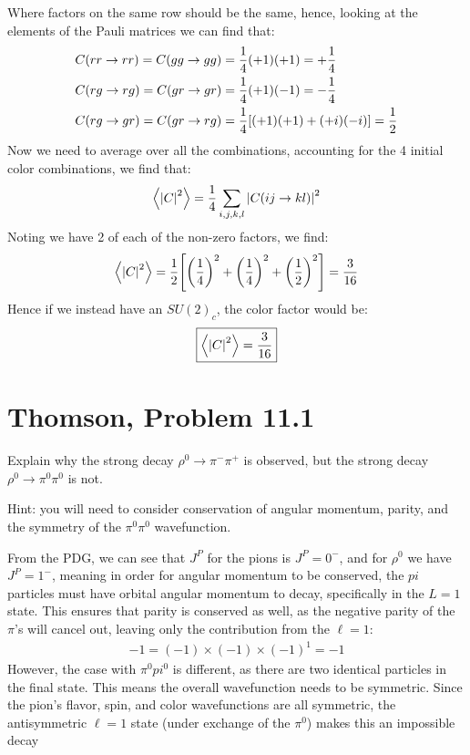 \documentclass[12pt]{article}
\begin{document}
Where factors on the same row should be the same, hence, looking at the elements of the Pauli matrices we can find that:
\begin{align*}
  C(rr\to rr)=C(gg\to gg)&=\frac14(+1)(+1)=+\frac14\\
  C(rg\to rg)=C(gr\to gr)&=\frac14(+1)(-1)=-\frac14\\
  C(rg\to gr)=C(gr\to rg)&=\frac14\qty[(+1)(+1)+(+i)(-i)]=\frac12
\end{align*}
Now we need to average over all the combinations, accounting for the 4 initial color combinations, we find that:
\begin{align*}
  \ev{\abs{C}^2}=\frac14\sum_{i,j,k,l}\abs{C(ij\to kl)}^2
\end{align*}
Noting we have 2 of each of the non-zero factors, we find:
\begin{align*}
  \ev{\abs{C}^2}=\frac12
  \qty[{\qty(\frac14)}^2+{\qty(\frac14)}^2+{\qty(\frac12)}^2]
  =\frac3{16}
\end{align*}
Hence if we instead have an ${SU(2)}_c$, the color factor would be:
\begin{equation}
  \label{eq:p1}
  \boxed{\ev{\abs{C}^2}=\frac3{16}}
\end{equation}
\newpage
\section{Thomson, Problem 11.1}
\begin{problem}
  Explain why the strong decay $\rho^0\to\pi^-\pi^+$ is observed, but the strong decay $\rho^0\to\pi^0\pi^0$ is not.

  Hint: you will need to consider conservation of angular momentum, parity, and the symmetry of the $\pi^0\pi^0$ wavefunction.
\end{problem}
From the PDG, we can see that $J^P$ for the pions is $J^P=0^-$, and for $\rho^0$ we have $J^P=1^-$, meaning in order for angular momentum to be conserved, the $pi$ particles must have orbital angular momentum to decay, specifically in the $L=1$ state. This ensures that parity is conserved as well, as the negative parity of the $\pi$'s will cancel out, leaving only the contribution from the $\ell=1$:
\begin{align*}
  -1=(-1)\times(-1)\times{(-1)}^1=-1
\end{align*}
However, the case with $\pi^0pi^0$ is different, as there are two identical particles in the final state. This means the overall wavefunction needs to be symmetric. Since the pion's flavor, spin, and color wavefunctions are all symmetric, the antisymmetric $\ell=1$ state (under exchange of the $\pi^0$) makes this an impossible decay
\newpage
\end{document}
